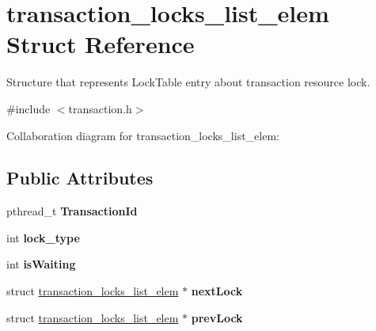 \hypertarget{structtransaction__locks__list__elem}{}\section{transaction\+\_\+locks\+\_\+list\+\_\+elem Struct Reference}
\label{structtransaction__locks__list__elem}


Structure that represents Lock\+Table entry about transaction resource lock.  




{\ttfamily \#include $<$transaction.\+h$>$}



Collaboration diagram for transaction\+\_\+locks\+\_\+list\+\_\+elem\+:
\subsection*{Public Attributes}
\begin{DoxyCompactItemize}
\item 
pthread\+\_\+t {\bfseries Transaction\+Id}\hypertarget{structtransaction__locks__list__elem_a89663ab688fdc69536811ff376fc2ae1}{}\label{structtransaction__locks__list__elem_a89663ab688fdc69536811ff376fc2ae1}

\item 
int {\bfseries lock\+\_\+type}\hypertarget{structtransaction__locks__list__elem_a27e32cb2ffe4dc6d09315686498b552c}{}\label{structtransaction__locks__list__elem_a27e32cb2ffe4dc6d09315686498b552c}

\item 
int {\bfseries is\+Waiting}\hypertarget{structtransaction__locks__list__elem_ab6ded356cab32f4bd04bd5993f4e9c53}{}\label{structtransaction__locks__list__elem_ab6ded356cab32f4bd04bd5993f4e9c53}

\item 
struct \hyperlink{structtransaction__locks__list__elem}{transaction\+\_\+locks\+\_\+list\+\_\+elem} $\ast$ {\bfseries next\+Lock}\hypertarget{structtransaction__locks__list__elem_a80609433b1b31557377dd3489cc74c51}{}\label{structtransaction__locks__list__elem_a80609433b1b31557377dd3489cc74c51}

\item 
struct \hyperlink{structtransaction__locks__list__elem}{transaction\+\_\+locks\+\_\+list\+\_\+elem} $\ast$ {\bfseries prev\+Lock}\hypertarget{structtransaction__locks__list__elem_acafc0b84518b79c03b7ff9838dc7bb6e}{}\label{structtransaction__locks__list__elem_acafc0b84518b79c03b7ff9838dc7bb6e}

\end{DoxyCompactItemize}


